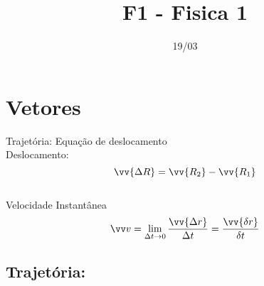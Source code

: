 \documentclass[12pt]{report}
\renewcommand{\vec}{\vv}
\begin{document}
\title{F1 - Fisica 1}
\author{}
\date{19/03}

\maketitle

\tableofcontents

\break

\chapter{Vetores}

Trajetória: Equação de deslocamento \\
Deslocamento: \[ \vec {\Delta R} = \vec{R_2}-\vec{R_1}  \] \\
Velocidade Instantânea \[ \vec v = \lim_{\Delta t \to 0} \frac{\vec {\Delta r}}{\Delta t} = \frac{\vec {\delta r}}{\delta t} \]

\section{ Trajetória: } 
\end{document}
